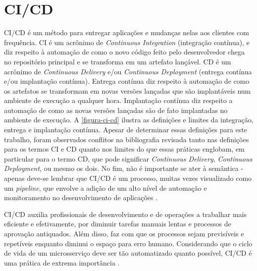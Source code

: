 \section{CI/CD}
CI/CD é um método para entregar aplicações e mudanças nelas aos clientes com frequência. CI é um acrônimo de \emph{Continuous Integration} (integração contínua), e diz respeito à automação de como o novo código feito pelo desenvolvedor chega no repositório principal e se transforma em um artefato lançável. CD é um acrônimo de \emph{Continuous Delivery} e/ou \emph{Continuous Deployment} (entrega contínua e/ou implantação contínua). Entrega contínua diz respeito à automação de como os artefatos se transformam em novas versões lançadas que são implantáveis num ambiente de execução a qualquer hora. Implantação contínua diz respeito a automação de como as novas versões lançadas são de fato implantadas no ambiente de execução. A \autoref{figura-ci-cd} ilustra as definições e limites da integração, entrega e implantação contínua. Apesar de determinar essas definições para este trabalho, foram observados conflitos na bibliografia revisada tanto nas definições para os termos CI e CD quanto nos limites do que essas práticas englobam, em particular para o termo CD, que pode significar \emph{Continuous Delivery}, \emph{Continuous Deployment}, ou mesmo os dois. No fim, não é importante se ater à semântica - apenas deve-se lembrar que CI/CD é um processo, muitas vezes visualizado como um \emph{pipeline}, que envolve a adição de um alto nível de automação e monitoramento no desenvolvimento de aplicações \cite{redhat-ci-cd, harness-ci-cd, gitlab-ci-cd}.

CI/CD auxilia profissionais de desenvolvimento e de operações a trabalhar mais eficiente e efetivamente, por diminuir tarefas manuais lentas e processos de aprovação antiquados. Além disso, faz com que os processos sejam previsíveis e repetíveis enquanto diminui o espaço para erro humano. Considerando que o ciclo de vida de um microsserviço deve ser tão automatizado quanto possível, CI/CD é uma prática de extrema importância \cite{gitlab-ci-cd}.

